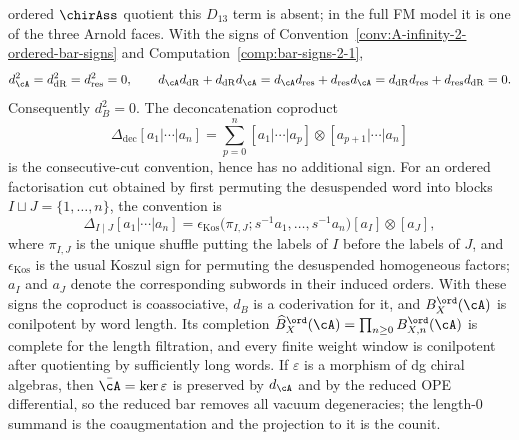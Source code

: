 \begin{proposition}
ordered $\chirAss$ quotient this $D_{13}$ term is absent; in the full
FM model it is one of the three Arnold faces.
With the signs of
Convention~\ref{conv:A-infinity-2-ordered-bar-signs} and
Computation~\ref{comp:bar-signs-2-1},
\[
d_\cA^2=d_{\mathrm{dR}}^2=d_{\mathrm{res}}^2=0,\qquad
d_\cA d_{\mathrm{dR}}+d_{\mathrm{dR}}d_\cA=
d_\cA d_{\mathrm{res}}+d_{\mathrm{res}}d_\cA=
d_{\mathrm{dR}}d_{\mathrm{res}}+d_{\mathrm{res}}d_{\mathrm{dR}}=0.
\]
Consequently $d_B^2=0$. The deconcatenation coproduct
\[
\Delta_{\mathrm{dec}}[a_1|\cdots|a_n]
=
\sum_{p=0}^{n}
[a_1|\cdots|a_p]\otimes[a_{p+1}|\cdots|a_n]
\]
is the consecutive-cut convention, hence has no additional sign. For an
ordered factorisation cut obtained by first permuting the desuspended
word into blocks \(I\sqcup J=\{1,\ldots,n\}\), the convention is
\[
\Delta_{I\mid J}[a_1|\cdots|a_n]
=
\epsilon_{\mathrm{Kos}}\!\bigl(\pi_{I,J};
s^{-1}a_1,\ldots,s^{-1}a_n\bigr)
[a_I]\otimes[a_J],
\]
where \(\pi_{I,J}\) is the unique shuffle putting the labels of \(I\)
before the labels of \(J\), and \(\epsilon_{\mathrm{Kos}}\) is the usual
Koszul sign for permuting the desuspended homogeneous factors; \(a_I\)
and \(a_J\) denote the corresponding subwords in their induced orders.
With these signs the coproduct
is coassociative, $d_B$ is a coderivation for it, and
$B_X^{\ord}(\cA)$ is conilpotent by word length. Its completion
$\widehat B_X^{\ord}(\cA)=\prod_{n\ge0}B^{\ord}_{X,n}(\cA)$ is complete
for the length filtration, and every finite weight window is
conilpotent after quotienting by sufficiently long words. If
$\varepsilon$ is a morphism of dg chiral algebras, then
$\bar\cA=\ker\varepsilon$ is preserved by $d_\cA$ and by the reduced
OPE differential, so the reduced bar removes all vacuum degeneracies;
the length-$0$ summand is the coaugmentation and the projection to it
is the counit.
\end{proposition}


